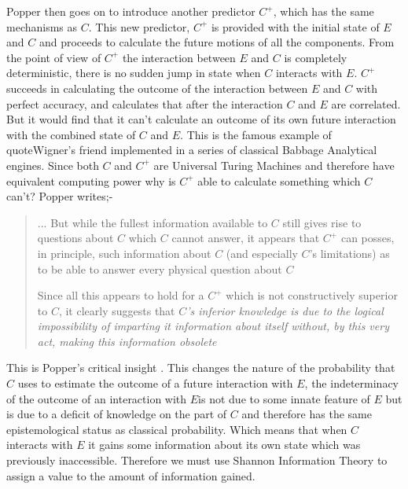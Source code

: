\documentclass{article}
\begin{document}
Popper then goes on to introduce another predictor $C^+$, which has the same mechanisms as $C$. This new predictor, $C^+$ is provided with the initial state of $E$ and $C$ and proceeds to calculate the future motions of all the components. From the point of view of $C^+$ the interaction between $E$ and $C$ is completely deterministic, there is no sudden jump in state when $C$ interacts with $E$. $C^+$ succeeds in calculating the outcome of the interaction between $E$ and $C$ with perfect accuracy, and calculates that after the interaction $C$ and $E$ are correlated. But it would find that it can't calculate an outcome of its own future interaction with the combined state of $C$ and $E$. This is the famous example of \textquote{}quote{Wigner's friend} \autocite{wigner_1961} implemented in a series of classical Babbage Analytical engines. Since both $C$ and $C^+$ are Universal Turing Machines and therefore have equivalent computing power why is $C^+$ able to calculate something which $C$ can't?
Popper writes;-
\begin{quotation}
  ... But while the fullest information available to $C$ still gives rise to questions about $C$ which $C$ cannot answer, it appears that $C^+$ can posses, in principle, such information about $C$ (and especially $C$'s limitations) as to be able to answer every physical question about $C$
  \par
  Since all this appears to hold for a $C^+$ which is not constructively superior to $C$, it clearly suggests that \emph{$C$'s inferior knowledge is due to the logical impossibility of imparting it information about itself without, by this very act, making this information obsolete}
  \par
  \hfill \autocite[p.~188]{Popper1950a}
\end{quotation}
This is Popper's critical insight . This changes the nature of the probability that $C$ uses to estimate the outcome of a future interaction with $E$, the indeterminacy of the outcome of an interaction with $E$is not due to some innate feature of $E$ but is due to a deficit of knowledge on the part of $C$ and therefore has the same epistemological status as classical probability. Which means that when $C$ interacts with $E$ it gains some information about its own state which was previously inaccessible. Therefore we must use Shannon Information Theory to assign a value to the amount of information gained.
\end{document}
